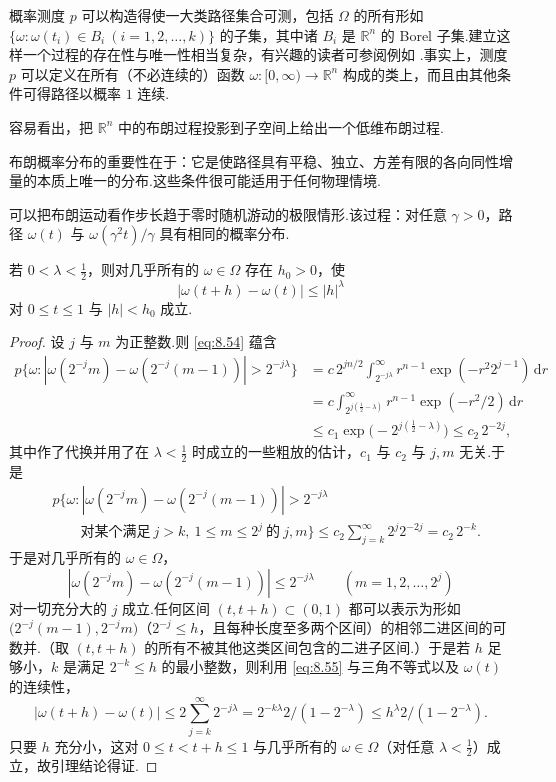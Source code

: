 概率测度 $p$ 可以构造得使一大类路径集合可测，包括 $\Omega$ 的所有形如 $\{\omega:\omega(t_i)\in B_i\ (i=1,2,\ldots,k)\}$ 的子集，其中诸 $B_i$ 是 $\mathbb{R}^n$ 的 Borel 子集.建立这样一个过程的存在性与唯一性相当复杂，有兴趣的读者可参阅例如 \textcite{hida1980}.事实上，测度 $p$ 可以定义在所有（不必连续的）函数 $\omega:[0,\infty)\to\mathbb{R}^n$ 构成的类上，而且由其他条件可得路径以概率 $1$ 连续.

容易看出，把 $\mathbb{R}^n$ 中的布朗过程投影到子空间上给出一个低维布朗过程.

布朗概率分布的重要性在于：它是使路径具有平稳、独立、方差有限的各向同性增量的本质上唯一的分布.这些条件很可能适用于任何物理情境.

可以把布朗运动看作步长趋于零时随机游动的极限情形.该过程：对任意 $\gamma>0$，路径 $\omega(t)$ 与 $\omega(\gamma^2 t)/\gamma$ 具有相同的概率分布.

\begin{lemma}\label{lem:8.22}
若 $0<\lambda<\frac{1}{2}$，则对几乎所有的 $\omega\in\Omega$ 存在 $h_0>0$，使
\[
  |\omega(t+h)-\omega(t)|\leq|h|^{\lambda}
\]
对 $0\leq t\leq 1$ 与 $|h|<h_0$ 成立.
\end{lemma}

\begin{proof}
设 $j$ 与 $m$ 为正整数.则 \eqref{eq:8.54} 蕴含
\[
\begin{aligned}
  p\bigl\{\omega:|\omega(2^{-j}m)-\omega(2^{-j}(m-1))|>2^{-j\lambda}\bigr\}
  &=c\,2^{jn/2}\int_{2^{-j\lambda}}^{\infty}r^{n-1}\exp(-r^{2}2^{j-1})\,\mathrm{d}r\\
  &=c\int_{2^{j(\frac{1}{2}-\lambda)}}^{\infty}r^{n-1}\exp(-r^{2}/2)\,\mathrm{d}r\\
  &\leq c_1\exp\bigl(-2^{j(\frac{1}{2}-\lambda)}\bigr)
  \leq c_2\,2^{-2j},
\end{aligned}
\]
其中作了代换并用了在 $\lambda<\frac{1}{2}$ 时成立的一些粗放的估计，$c_1$ 与 $c_2$ 与 $j,m$ 无关.于是
\begin{align*}
  &p\{\omega:|\omega(2^{-j}m)-\omega(2^{-j}(m-1))|>2^{-j\lambda}\\
  &\qquad\text{对某个满足}\ j>k,\ 1\leq m\leq 2^j\ \text{的}\ j,m\}
  \leq c_2\sum_{j=k}^{\infty}2^{j}2^{-2j}=c_2\,2^{-k}.
\end{align*}
于是对几乎所有的 $\omega\in\Omega$，
\begin{equation}\label{eq:8.55}
  |\omega(2^{-j}m)-\omega(2^{-j}(m-1))|\leq 2^{-j\lambda}\qquad(m=1,2,\ldots,2^{j})
\end{equation}
对一切充分大的 $j$ 成立.任何区间 $(t,t+h)\subset(0,1)$ 都可以表示为形如 $\bigl(2^{-j}(m-1),2^{-j}m\bigr)$（$2^{-j}\leq h$，且每种长度至多两个区间）的相邻二进区间的可数并.（取 $(t,t+h)$ 的所有不被其他这类区间包含的二进子区间.）于是若 $h$ 足够小，$k$ 是满足 $2^{-k}\leq h$ 的最小整数，则利用 \eqref{eq:8.55} 与三角不等式以及 $\omega(t)$ 的连续性，
\[
  |\omega(t+h)-\omega(t)|\leq 2\sum_{j=k}^{\infty}2^{-j\lambda}=2^{-k\lambda}2/(1-2^{-\lambda})\leq h^{\lambda}2/(1-2^{-\lambda}).
\]
只要 $h$ 充分小，这对 $0\leq t<t+h\leq 1$ 与几乎所有的 $\omega\in\Omega$（对任意 $\lambda<\frac{1}{2}$）成立，故引理结论得证.
\end{proof}

